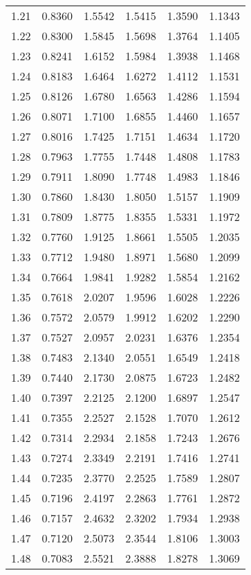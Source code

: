 \documentclass{article}
\begin{document}
\begin{longtable}{cccccc}
1.21 & 0.8360 & 1.5542 & 1.5415 & 1.3590 & 1.1343 \\
1.22 & 0.8300 & 1.5845 & 1.5698 & 1.3764 & 1.1405 \\
1.23 & 0.8241 & 1.6152 & 1.5984 & 1.3938 & 1.1468 \\
1.24 & 0.8183 & 1.6464 & 1.6272 & 1.4112 & 1.1531 \\
1.25 & 0.8126 & 1.6780 & 1.6563 & 1.4286 & 1.1594 \\
1.26 & 0.8071 & 1.7100 & 1.6855 & 1.4460 & 1.1657 \\
1.27 & 0.8016 & 1.7425 & 1.7151 & 1.4634 & 1.1720 \\
1.28 & 0.7963 & 1.7755 & 1.7448 & 1.4808 & 1.1783 \\
1.29 & 0.7911 & 1.8090 & 1.7748 & 1.4983 & 1.1846 \\
1.30 & 0.7860 & 1.8430 & 1.8050 & 1.5157 & 1.1909 \\
1.31 & 0.7809 & 1.8775 & 1.8355 & 1.5331 & 1.1972 \\
1.32 & 0.7760 & 1.9125 & 1.8661 & 1.5505 & 1.2035 \\
1.33 & 0.7712 & 1.9480 & 1.8971 & 1.5680 & 1.2099 \\
1.34 & 0.7664 & 1.9841 & 1.9282 & 1.5854 & 1.2162 \\
1.35 & 0.7618 & 2.0207 & 1.9596 & 1.6028 & 1.2226 \\
1.36 & 0.7572 & 2.0579 & 1.9912 & 1.6202 & 1.2290 \\
1.37 & 0.7527 & 2.0957 & 2.0231 & 1.6376 & 1.2354 \\
1.38 & 0.7483 & 2.1340 & 2.0551 & 1.6549 & 1.2418 \\
1.39 & 0.7440 & 2.1730 & 2.0875 & 1.6723 & 1.2482 \\
1.40 & 0.7397 & 2.2125 & 2.1200 & 1.6897 & 1.2547 \\
1.41 & 0.7355 & 2.2527 & 2.1528 & 1.7070 & 1.2612 \\
1.42 & 0.7314 & 2.2934 & 2.1858 & 1.7243 & 1.2676 \\
1.43 & 0.7274 & 2.3349 & 2.2191 & 1.7416 & 1.2741 \\
1.44 & 0.7235 & 2.3770 & 2.2525 & 1.7589 & 1.2807 \\
1.45 & 0.7196 & 2.4197 & 2.2863 & 1.7761 & 1.2872 \\
1.46 & 0.7157 & 2.4632 & 2.3202 & 1.7934 & 1.2938 \\
1.47 & 0.7120 & 2.5073 & 2.3544 & 1.8106 & 1.3003 \\
1.48 & 0.7083 & 2.5521 & 2.3888 & 1.8278 & 1.3069 \\

\end{longtable}
\end{document}
